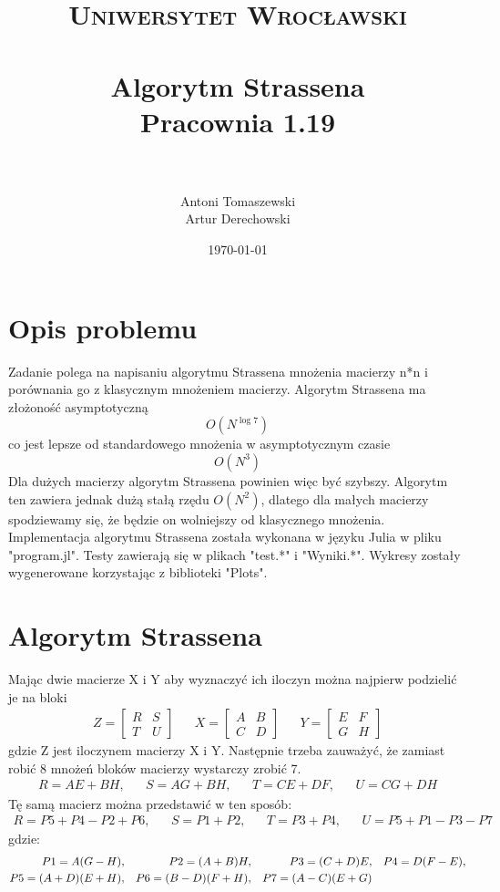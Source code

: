 \documentclass[paper=a4, fontsize=11pt]{scrartcl} %
\title{	
\normalfont \normalsize 
\textsc{Uniwersytet Wrocławski} \\ [25pt] %
\horrule{0.5pt} \\[0.4cm] %
\huge Algorytm Strassena \\
\large Pracownia 1.19 \\ %
\horrule{2pt} \\[0.5cm] %
}
\author{Antoni Tomaszewski \\ Artur Derechowski} %
\date{\normalsize\today} %
\numberwithin{equation}{section} %
\numberwithin{figure}{section} %
\numberwithin{table}{section} %
\begin{document}
\maketitle %


\section{Opis problemu}

Zadanie polega na napisaniu algorytmu Strassena mnożenia macierzy n*n  i porównania go z klasycznym mnożeniem macierzy. Algorytm Strassena ma złożoność asymptotyczną 
\[ O(N^{\log 7 } )\]
co jest lepsze od standardowego mnożenia w asymptotycznym czasie \[ O(N^{3} )\] Dla dużych macierzy algorytm Strassena powinien więc być szybszy. Algorytm ten zawiera jednak dużą stałą
rzędu $O(N^2)$, dlatego dla małych macierzy spodziewamy się, że będzie on wolniejszy od klasycznego mnożenia.\medbreak
Implementacja algorytmu Strassena została wykonana w języku Julia w pliku "program.jl".
Testy zawierają się w plikach "test.*" i "Wyniki.*".
Wykresy zostały wygenerowane korzystając z biblioteki "Plots".

\section{Algorytm Strassena}

Mając dwie macierze X i Y aby wyznaczyć ich iloczyn można najpierw podzielić je na bloki
\begin{align}
Z = 
\begin{bmatrix}
R & S \\
T & U
\end{bmatrix} &&
X = 
\begin{bmatrix}
A & B \\
C & D
\end{bmatrix} &&
Y = 
\begin{bmatrix}
E & F \\
G & H
\end{bmatrix}
\end{align}
gdzie Z jest iloczynem macierzy X i Y. Następnie trzeba zauważyć, że zamiast robić 8 mnożeń bloków macierzy wystarczy zrobić 7.\\
\begin{align}
R = AE + BH, && S = AG + BH, && T = CE + DF, && U = CG + DH
\end{align}
Tę samą macierz można przedstawić w ten sposób:\\
\begin{align}
R = P5 + P4 - P2 + P6, && S = P1 + P2, && T = P3 + P4, && U = P5 + P1 - P3 - P7
\end{align}
gdzie:\\
\begin{align}
P1 = A(G - H), && P2 = (A + B)H, && P3 = (C + D)E, && P4 = D(F - E), \notag\\
P5 = (A + D)(E + H), && P6 = (B - D)(F + H), && P7 = (A - C)(E + G)
\end{align}
\end{document}
